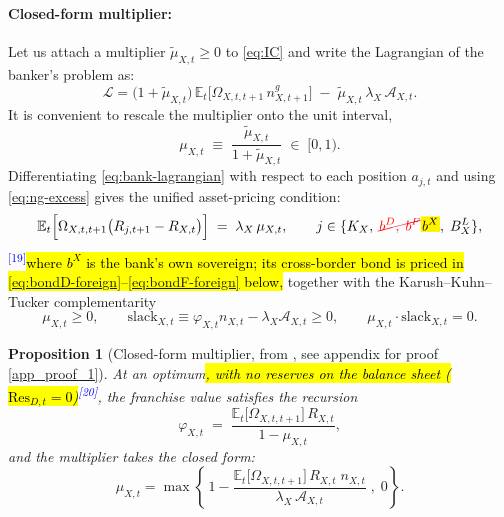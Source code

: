 \documentclass[11pt]{article}
\newcommand{\E}{\mathbb{E}}
\newtheorem{proposition}{Proposition}
\newcommand{\A}[1]{\hl{#1}}
\newcommand{\Am}[1]{\mathchoice
  {{\setlength{\fboxsep}{1pt}\colorbox{yellow}{$\displaystyle #1$}}}
  {{\setlength{\fboxsep}{1pt}\colorbox{yellow}{$\textstyle #1$}}}
  {{\setlength{\fboxsep}{1pt}\colorbox{yellow}{$\scriptstyle #1$}}}
  {{\setlength{\fboxsep}{1pt}\colorbox{yellow}{$\scriptscriptstyle #1$}}}}
\newcommand{\Dm}[1]{{\color{red}\cancel{#1}}}
\newcommand{\chg}[1]{\textsuperscript{\textcolor{blue}{\scriptsize[#1]}}}
\begin{document}
\paragraph{Closed-form multiplier:} Let us attach a multiplier $\tilde\mu_{X,t}\ge0$ to \eqref{eq:IC} and write the Lagrangian of the banker's problem as:
\begin{equation}
\mathcal{L}
=\bigl(1+\tilde\mu_{X,t}\bigr)\,
  \E_t\bigl[\Omega_{X,t,t+1}\,n^{g}_{X,t+1}\bigr]
  \;-\;\tilde\mu_{X,t}\,\lambda_X\,\mathcal{A}_{X,t}.
\label{eq:bank-lagrangian}
\end{equation}
It is convenient to rescale the multiplier onto the unit interval,
\begin{equation}
\mu_{X,t}\;\equiv\;\frac{\tilde\mu_{X,t}}{1+\tilde\mu_{X,t}}\;\in\;[0,1).
\label{eq:mu-rescale}
\end{equation}
Differentiating \eqref{eq:bank-lagrangian} with respect to each position $a_{j,t}$
and using \eqref{eq:ng-excess} gives the unified asset-pricing condition:
\begin{equation}
\E_t\Bigl[\Omega_{X,t,t+1}\bigl(R_{j,t+1}-R_{X,t}\bigr)\Bigr]
\;=\;\lambda_X\,\mu_{X,t},
\qquad j\in\{K_X,\;\Dm{b^{D},\;b^{F}}\Am{b^{X}},\;B_X^L\},
\label{eq:foc-general}
\end{equation}
\chg{19}\A{where $b^X$ is the bank's own sovereign; its cross-border bond is priced in {\eqref{eq:bondD-foreign}}--{\eqref{eq:bondF-foreign}} below,} together with the Karush--Kuhn--Tucker complementarity
\begin{equation}
\mu_{X,t}\ge0,
\qquad
\mathrm{slack}_{X,t}\equiv\varphi_{X,t}n_{X,t}-\lambda_X\mathcal{A}_{X,t}\ge0,
\qquad
\mu_{X,t}\cdot\mathrm{slack}_{X,t}=0 .
\label{eq:kkt}
\end{equation}

\begin{proposition}[Closed-form multiplier, from \cite{bocola2016pass}, see appendix for proof \ref{app_proof_1}]
\label{prop:mu}
At an optimum\A{, with no reserves on the balance sheet ($\mathrm{Res}_{D,t}=0$)}\chg{20}, the franchise value satisfies the recursion
\begin{equation}
\varphi_{X,t}\;=\;\frac{\E_t\bigl[\Omega_{X,t,t+1}\bigr]\,R_{X,t}}{1-\mu_{X,t}},
\label{eq:phi-recursion}
\end{equation}
and the multiplier takes the closed form:
\begin{equation}
\mu_{X,t}
=\max\left\{\,1-\frac{\E_t\bigl[\Omega_{X,t,t+1}\bigr]\,R_{X,t}\;n_{X,t}}
                     {\lambda_X\,\mathcal{A}_{X,t}}\;,\;0\right\}.
\label{eq:mu-closed}
\end{equation}
\end{proposition}
\end{document}
